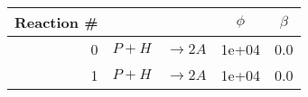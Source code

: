\begin{tabular}{r|rlcc}
Reaction \# & & & $ \phi $ & $ \beta $ \\
\hline0 & $P + H $ & $\rightarrow 2A $& 1e+04 & 0.0\\
1 & $P + H $ & $\rightarrow 2A $& 1e+04 & 0.0\\
\end{tabular}
